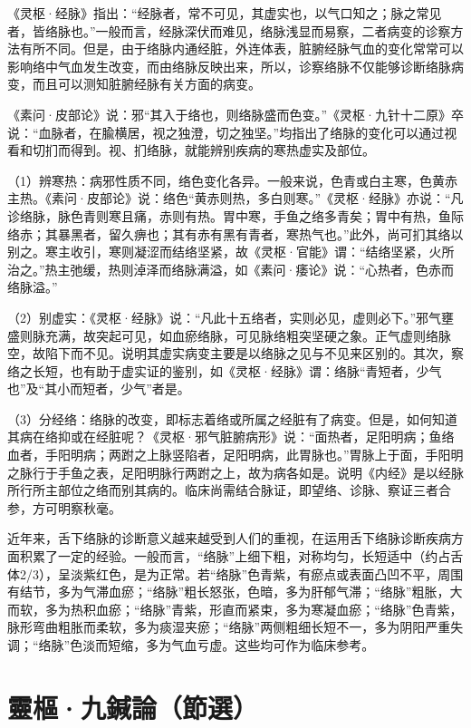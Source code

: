 \documentclass[12pt]{ctexbook}%
\begin{document}


《灵枢·经脉》指出：“经脉者，常不可见，其虚实也，以气口知之；脉之常见者，皆络脉也。”一般而言，经脉深伏而难见，络脉浅显而易察，二者病变的诊察方法有所不同。但是，由于络脉内通经脏，外连体表，脏腑经脉气血的变化常常可以影响络中气血发生改变，而由络脉反映出来，所以，诊察络脉不仅能够诊断络脉病变，而且可以测知脏腑经脉有关方面的病变。

《素问·皮部论》说：邪“其入于络也，则络脉盛而色变。”《灵枢·九针十二原》卒说：“血脉者，在腧横居，视之独澄，切之独坚。”均指出了络脉的变化可以通过视看和切扪而得到。视、扪络脉，就能辨别疾病的寒热虚实及部位。

（1）辨寒热：病邪性质不同，络色变化各异。一般来说，色青或白主寒，色黄赤主热。《素问·皮部论》说：络色“黄赤则热，多白则寒。”《灵枢·经脉》亦说：“凡诊络脉，脉色青则寒且痛，赤则有热。胃中寒，手鱼之络多青矣；胃中有热，鱼际络赤；其暴黑者，留久痹也；其有赤有黑有青者，寒热气也。”此外，尚可扪其络以别之。寒主收引，寒则凝涩而结络坚紧，故《灵枢·官能》谓：“结络坚紧，火所治之。”热主弛缓，热则淖泽而络脉满溢，如《素问·痿论》说：“心热者，色赤而络脉溢。”

（2）别虚实：《灵枢·经脉》说：“凡此十五络者，实则必见，虚则必下。”邪气壅盛则脉充满，故突起可见，如血瘀络脉，可见脉络粗突坚硬之象。正气虚则络脉空，故陷下而不见。说明其虚实病变主要是以络脉之见与不见来区别的。其次，察络之长短，也有助于虚实证的鉴别，如《灵枢·经脉》谓：络脉“青短者，少气也”及“其小而短者，少气”者是。

（3）分经络：络脉的改变，即标志着络或所属之经脏有了病变。但是，如何知道其病在络抑或在经脏呢？《灵枢·邪气脏腑病形》说：“面热者，足阳明病；鱼络血者，手阳明病；两跗之上脉竖陷者，足阳明病，此胃脉也。”胃脉上于面，手阳明之脉行于手鱼之表，足阳明脉行两跗之上，故为病各如是。说明《内经》是以经脉所行所主部位之络而别其病的。临床尚需结合脉证，即望络、诊脉、察证三者合参，方可明察秋毫。

近年来，舌下络脉的诊断意义越来越受到人们的重视，在运用舌下络脉诊断疾病方面积累了一定的经验。一般而言，“络脉”上细下粗，对称均匀，长短适中（约占舌体2/3），呈淡紫红色，是为正常。若“络脉”色青紫，有瘀点或表面凸凹不平，周围有结节，多为气滞血瘀；“络脉”粗长怒张，色暗，多为肝郁气滞；“络脉”粗胀，大而软，多为热积血瘀；“络脉”青紫，形直而紧束，多为寒凝血瘀；“络脉”色青紫，脉形弯曲粗胀而柔软，多为痰湿夹瘀；“络脉”两侧粗细长短不一，多为阴阳严重失调；“络脉”色淡而短缩，多为气血亏虚。这些均可作为临床参考。

\section{靈樞·九鍼論（節選）}%
\end{document}
